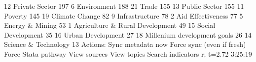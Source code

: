    12    Private Sector                                    197
   6     Environment                                       188
   21    Trade                                             155
   13    Public Sector                                     155
   11    Poverty                                           145
   19    Climate Change                                     82
   9     Infrastructure                                     78
   2     Aid Effectiveness                                  77
   5     Energy \& Mining                                    53
   1     Agriculture \& Rural Development                    49
   15    Social Development                                 35
   16    Urban Development                                  27
   18    Millenium development goals                        26
   14    Science \& Technology                               13
{\smallskip}
{\smallskip}
Actions:
{\smallskip}
    Sync metadata now
    Force sync (even if fresh)
    Force Stata pathway
{\smallskip}
    View sources
    View topics
    Search indicators
{\smallskip}
r; t=2.72 3:25:19
